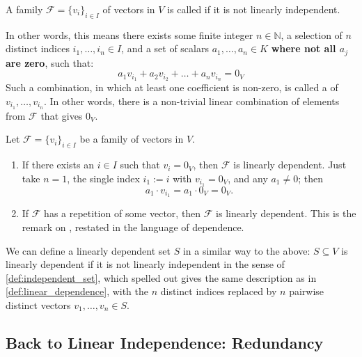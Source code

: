 \begin{definition}
\label{def:linear_dependence}
A family $\mathcal{F} = \{v_i\}_{i \in I}$ of vectors in $V$ is called  if it is not linearly independent.

In other words, this means there exists some finite integer $n \in \mathbb{N}$, a selection of $n$ distinct indices $i_1, \dots, i_n \in I$, and a set of scalars $a_1, \dots, a_n \in K$ \textbf{where not all $a_j$ are zero}, such that:
\[
a_1 v_{i_1} + a_2 v_{i_2} + \dots + a_n v_{i_n} = 0_V
\]
Such a combination, in which at least one coefficient is non-zero, is called a  of $v_{i_1}, \dots, v_{i_n}$. In other words, there is a non-trivial linear combination of elements from $\mathcal{F}$ that gives $0_V$.
\end{definition}

\begin{remark}
\label{rem:dependence_basics}
Let $\mathcal{F} = \{v_i\}_{i \in I}$ be a family of vectors in $V$.
\begin{enumerate}[label=\textbf{(\arabic*)}]
    \item If there exists an $i \in I$ such that $v_i = 0_V$, then $\mathcal{F}$ is linearly dependent. Just take $n = 1$, the single index $i_1 := i$ with $v_{i_1} = 0_V$, and any $a_1 \ne 0$; then
    \[
    a_1 \cdot v_{i_1} = a_1 \cdot 0_V = 0_V.
    \]
    \item If $\mathcal{F}$ has a repetition of some vector, then $\mathcal{F}$ is linearly dependent. This is the remark on , restated in the language of dependence.
\end{enumerate}
\end{remark}

\begin{remark}
\label{rem:dependent_set}
We can define a linearly dependent set $S$ in a similar way to the above: $S \subseteq V$ is linearly dependent if it is not linearly independent in the sense of \cref{def:independent_set}, which spelled out gives the same description as in \cref{def:linear_dependence}, with the $n$ distinct indices replaced by $n$ pairwise distinct vectors $v_1, \dots, v_n \in S$.
\end{remark}

\subsection{Back to Linear Independence: Redundancy}

